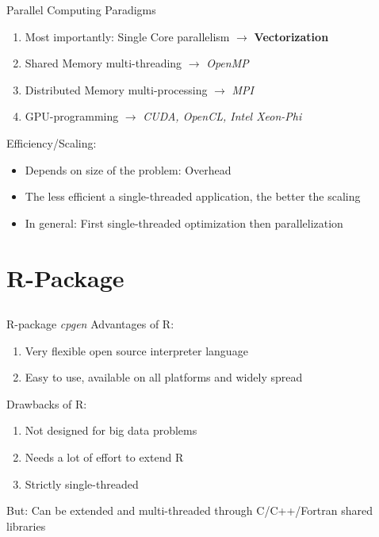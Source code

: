 \documentclass[xcolor=dvipsnames,aspectratio=169]{beamer}
\begin{document}
\begin{frame}{Parallel Computing Paradigms}
\pause
\begin{enumerate}
\item Most importantly: Single Core parallelism  $\rightarrow$ \textbf{Vectorization}
\item Shared Memory multi-threading $\rightarrow$ \textit{OpenMP}
\item Distributed Memory multi-processing $\rightarrow$ \textit{MPI}
\item GPU-programming $\rightarrow$ \textit{CUDA, OpenCL, Intel Xeon-Phi}
\end{enumerate}
\pause
Efficiency/Scaling:
\begin{itemize}
\item Depends on size of the problem: Overhead
\item The less efficient a single-threaded application, the better the scaling
\pause
\item In general: First single-threaded optimization then parallelization
\end{itemize}
\end{frame}


\section{R-Package}
\subsection*{}
\begin{frame}{R-package \textit{cpgen}}
\pause
Advantages of R:
\begin{enumerate}
\item Very flexible open source interpreter language
\item Easy to use, available on all platforms and widely spread
\end{enumerate}
Drawbacks of R:
\pause
\begin{enumerate}
\item Not designed for big data problems
\item Needs a lot of effort to extend R
\item Strictly single-threaded 
\end{enumerate}
\pause
But: Can be extended and multi-threaded through C/C++/Fortran shared libraries
\end{frame}
\end{document}
